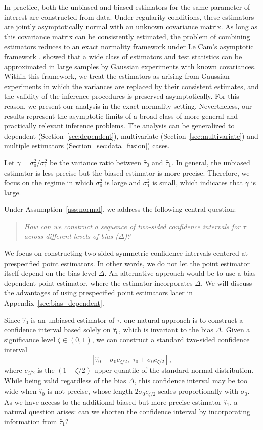 \documentclass[11pt]{article}
\newcommand{\htau}{\widehat\tau}
\numberwithin{equation}{section}
\theoremstyle{definition}
\begin{document}
In practice, both the unbiased and biased estimators for the same parameter of interest are constructed from data. Under regularity conditions, these estimators are jointly asymptotically normal with an unknown covariance matrix. As long as this covariance matrix can be consistently estimated, the problem of combining estimators reduces to an exact normality framework under Le Cam’s asymptotic framework \citep{le1956asymptotic}. \cite{le1956asymptotic} showed that a wide class of estimators and test statistics can be approximated in large samples by Gaussian experiments with known covariances. Within this framework, we treat the estimators as arising from Gaussian experiments in which the variances are replaced by their consistent estimates, and the validity of the inference procedures is preserved asymptotically. For this reason, we present our analysis in the exact normality setting. Nevertheless, our results represent the asymptotic limits of a broad class of more general and practically relevant inference problems. The analysis can be generalized to dependent (Section~\ref{sec:dependent}), multivariate (Section~\ref{sec:multivariate}) and multiple estimators (Section~\ref{sec:data_fusion}) cases.

Let $\gamma = \sigma_0^2/\sigma_1^2$ be the variance ratio between $\htau_0$ and $\htau_1$. In general, the unbiased estimator is less precise but the biased estimator is more precise. Therefore, we focus on the regime in which $\sigma_0^2$ is large and $\sigma_1^2$ is small, which indicates that $\gamma$ is large.

Under Assumption~\ref{ass:normal}, we address the following central question:
\begin{quote}
  \textit{How can we construct a sequence of two-sided confidence intervals for $\tau$ across different levels of bias ($\Delta$)?}
\end{quote}

We focus on constructing two-sided symmetric confidence intervals centered at prespecified point estimators. In other words, we do not let the point estimator itself depend on the bias level $\Delta$. An alternative approach would be to use a bias-dependent point estimator, where the estimator incorporates $\Delta$. We will discuss the advantages of using prespecified point estimators later in Appendix~\ref{sec:bias_dependent}.

Since $\htau_0$ is an unbiased estimator of $\tau$, one natural approach is to construct a confidence interval based solely on $\htau_0$, which is invariant to the bias $\Delta$. Given a significance level $\zeta \in (0,1)$, we can construct a standard two-sided confidence interval
\[
[\htau_0 - \sigma_0 c_{\zeta/2},\; \htau_0 + \sigma_0 c_{\zeta/2}],
\]
where $c_{\zeta/2}$ is the $(1-\zeta/2)$ upper quantile of the standard normal distribution. While being valid regardless of the bias $\Delta$, this confidence interval may be too wide when $\htau_0$ is not precise, whose length $2\sigma_0 c_{\zeta/2}$ scales proportionally with $\sigma_0$. As we have access to the additional biased but more precise estimator $\htau_1$, a natural question arises: can we shorten the confidence interval by incorporating information from $\htau_1$?
\end{document}
